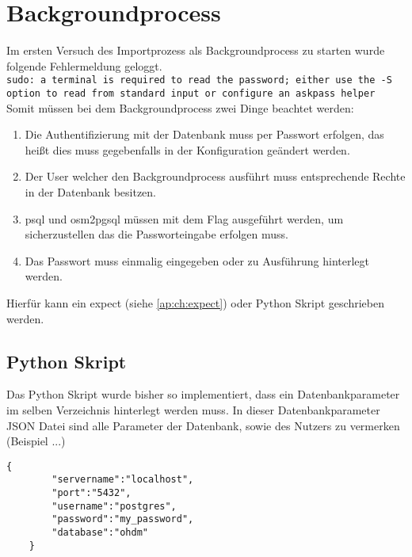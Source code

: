 \section{Backgroundprocess}
Im ersten Versuch des Importprozess als Backgroundprocess zu starten wurde folgende Fehlermeldung geloggt.\\
\lstinline[language={}]|sudo: a terminal is required to read the password; either use the -S option to read from standard input or configure an askpass helper|\\
Somit müssen bei dem Backgroundprocess zwei Dinge beachtet werden:
\begin{enumerate}
	\item Die Authentifizierung mit der Datenbank muss per Passwort erfolgen, das heißt dies muss gegebenfalls in der Konfiguration geändert werden.
	\item Der User welcher den Backgroundprocess ausführt muss entsprechende Rechte in der Datenbank besitzen.
	\item psql\cite{postgres-psql} und osm2pgsql\cite{osm2pgsql} müssen mit dem Flag  ausgeführt werden, um sicherzustellen das die Passworteingabe erfolgen muss.
	\item Das Passwort muss einmalig eingegeben oder zu Ausführung hinterlegt werden.
\end{enumerate}
Hierfür kann ein expect (siehe \autoref{ap:ch:expect}) oder Python Skript geschrieben werden.

\subsection{Python Skript}
Das Python Skript wurde bisher so implementiert, dass ein Datenbankparameter im selben Verzeichnis hinterlegt werden muss. In dieser Datenbankparameter JSON Datei sind alle Parameter der Datenbank, sowie des Nutzers zu vermerken (Beispiel ...)

\begin{lstlisting}[language={},caption={Beispiel einer JSON Datei für die Datenbankparameter}]
	{
		"servername":"localhost",
		"port":"5432",
		"username":"postgres",
		"password":"my_password",
		"database":"ohdm"
	}
\end{lstlisting}